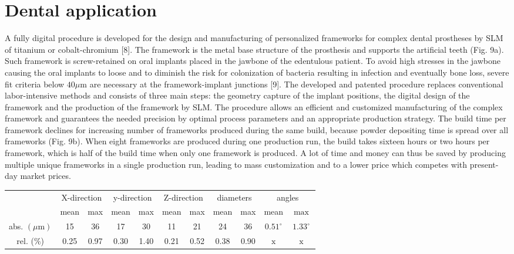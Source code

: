 \documentclass[10pt]{article}
\begin{document}
\section*{Dental application}
A fully digital procedure is developed for the design and manufacturing of personalized frameworks for complex dental prostheses by SLM of titanium or cobalt-chromium [8]. The framework is the metal base structure of the prosthesis and supports the artificial teeth (Fig. 9a). Such framework is screw-retained on oral implants placed in the jawbone of the edentulous patient. To avoid high stresses in the jawbone causing the oral implants to loose and to diminish the risk for colonization of bacteria resulting in infection and eventually bone loss, severe fit criteria below $40 \mu \mathrm{m}$ are necessary at the framework-implant junctions [9]. The developed and patented procedure replaces conventional labor-intensive methods and consists of three main steps: the geometry capture of the implant positions, the digital design of the framework and the production of the framework by SLM. The procedure allows an efficient and customized manufacturing of the complex framework and guarantees the needed precision by optimal process parameters and an appropriate production strategy. The build time per framework declines for increasing number of frameworks produced during the same build, because powder depositing time is spread over all frameworks (Fig. 9b). When eight frameworks are produced during one production run, the build takes sixteen hours or two hours per framework, which is half of the build time when only one framework is produced. A lot of time and money can thus be saved by producing multiple unique frameworks in a single production run, leading to mass customization and to a lower price which competes with present-day market prices.

\begin{center}
\begin{tabular}{|c|c|c|c|c|c|c||c|c||c|c||}
\hline
\multirow{2}{*}{} & \multicolumn{2}{c|}{X-direction} & \multicolumn{2}{c|}{y-direction} & \multicolumn{2}{c|}{Z-direction} & \multicolumn{2}{c||}{diameters} & \multicolumn{2}{c||}{angles} \\
\cline { 2 - 13 }
 & mean & max & mean & max & mean & max & mean & max & mean & $\max$ \\
\hline\hline
abs. $(\mu \mathrm{m})$ & 15 & 36 & 17 & 30 & 11 & 21 & 24 & 36 & $0.51^{\circ}$ & $1.33^{\circ}$ \\
\hline
rel. (\%) & 0.25 & 0.97 & 0.30 & 1.40 & 0.21 & 0.52 & 0.38 & 0.90 & $\mathrm{x}$ & $\mathrm{x}$ \\
\hline
\end{tabular}
\end{center}
\end{document}
